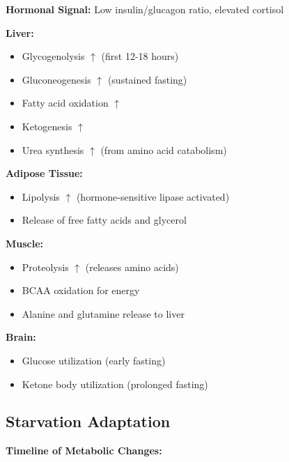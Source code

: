\begin{tcolorbox}[colback=orange!5, colframe=orange!70!black, title=\textbf{Fasting State: Catabolic Predominance}]
\textbf{Hormonal Signal:} Low insulin/glucagon ratio, elevated cortisol

\textbf{Liver:}
\begin{itemize}
    \item Glycogenolysis $\uparrow$ (first 12-18 hours)
    \item Gluconeogenesis $\uparrow$ (sustained fasting)
    \item Fatty acid oxidation $\uparrow$
    \item Ketogenesis $\uparrow$
    \item Urea synthesis $\uparrow$ (from amino acid catabolism)
\end{itemize}

\textbf{Adipose Tissue:}
\begin{itemize}
    \item Lipolysis $\uparrow$ (hormone-sensitive lipase activated)
    \item Release of free fatty acids and glycerol
\end{itemize}

\textbf{Muscle:}
\begin{itemize}
    \item Proteolysis $\uparrow$ (releases amino acids)
    \item BCAA oxidation for energy
    \item Alanine and glutamine release to liver
\end{itemize}

\textbf{Brain:}
\begin{itemize}
    \item Glucose utilization (early fasting)
    \item Ketone body utilization (prolonged fasting)
\end{itemize}
\end{tcolorbox}

\subsection{Starvation Adaptation}

\textbf{Timeline of Metabolic Changes:}

